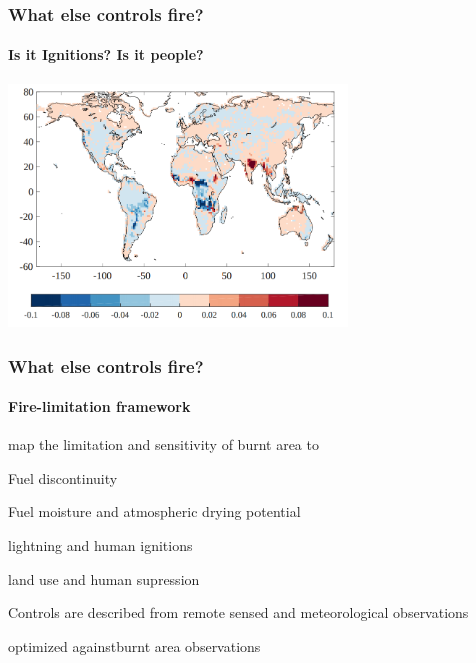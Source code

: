 
\begin{frame}
    \frametitle{What else controls fire?}
    \framesubtitle{Is it Ignitions? Is it people?}
    \includegraphics[width=9.0cm]{images/INFERNO}%
\end{frame}




\begin{frame}
    \frametitle{What else controls fire?}
    \framesubtitle{Fire-limitation framework}
	\begin{itemize}
		 {\item map the limitation and sensitivity of burnt area to}
        \begin{itemize}
             {\item Fuel discontinuity}
             {\item Fuel moisture and atmospheric drying potential}
             {\item lightning and human ignitions}
             {\item land use and human supression}
        \end{itemize}
		 {\item Controls are described from remote sensed and meteorological observations}
		 {\item optimized againstburnt area observations}
	\end{itemize}
\end{frame}
